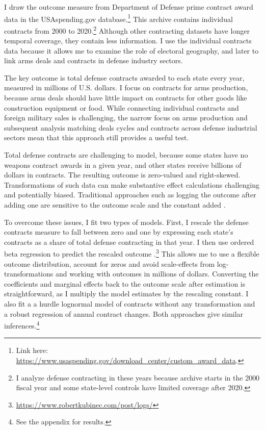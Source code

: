 \documentclass[12pt]{article}
\begin{document}
I draw the outcome measure from Department of Defense prime contract award data in the USAspending.gov database.\footnote{Link here: \url{https://www.usaspending.gov/download_center/custom_award_data}.} 
This archive contains individual contracts from 2000 to 2020.\footnote{I analyze defense contracting in these years because archive starts in the 2000 fiscal year and some state-level controls have limited coverage after 2020.}
Although other contracting datasets have longer temporal coverage, they contain less information.
I use the individual contracts data because it allows me to examine the role of electoral geography, and later to link arms deals and contracts in defense industry sectors. 


The key outcome is total defense contracts awarded to each state every year, measured in millions of U.S. dollars.
I focus on contracts for arms production, because arms deals should have little impact on contracts for other goods like construction equipment or food.
While connecting individual contracts and foreign military sales is challenging, the narrow focus on arms production and subsequent analysis matching deals cycles and contracts across defense industrial sectors mean that this approach still provides a useful test. 


Total defense contracts are challenging to model, because some states have no weapons contract awards in a given year, and other states receive billions of dollars in contracts. 
The resulting outcome is zero-valued and right-skewed. 
Transformations of such data can make substantive effect calculations challenging and potentially biased. 
Traditional approaches such as logging the outcome after adding one are sensitive to the outcome scale and the constant added \citep{ChenRoth2022, MullahyNorton2022}. 


To overcome these issues, I fit two types of models.
First, I rescale the defense contracts measure to fall between zero and one by expressing each state's contracts as a share of total defense contracting in that year.
I then use ordered beta regression to predict the rescaled outcome \citep{Kubinec2022}.\footnote{\url{https://www.robertkubinec.com/post/logs/}} 
This allows me to use a flexible outcome distribution, account for zeros and avoid scale-effects from log-transformations and working with outcomes in millions of dollars. 
Converting the coefficients and marginal effects back to the outcome scale after estimation is straightforward, as I multiply the model estimates by the rescaling constant.
I also fit a a hurdle lognormal model of contracts without any transformation and a robust regression of annual contract changes. 
Both approaches give similar inferences.\footnote{See the appendix for results.} 
\end{document}
